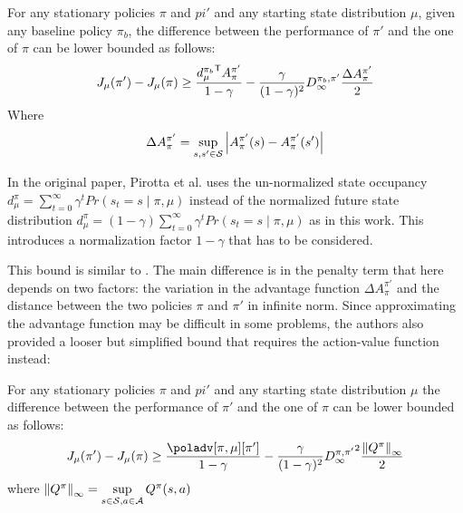 \begin{theorem}\label{th:pirotta-bound1}
For any stationary policies $\pi$ and $pi'$ and any starting state distribution $\mu$, given any baseline policy $\pi_b$, the difference between the performance of $\pi'$ and the one of $\pi$ can be lower bounded as follows:
\begin{equation}
J_{\mu}(\pi') - J_\mu(\pi) \geq \frac{\transpose{d_\mu^{\pi_b}}A_\pi^{\pi'}}{1-\gamma} - \frac{\gamma}{(1-\gamma)^2}{D_\infty^{\pi_b, \pi'}} \frac{\Delta A_{\pi}^{\pi'}}{2}
\end{equation}
Where
\begin{equation}
\Delta A_{\pi}^{\pi'} = \sup_{s, s'\in\sspace}\left|{A_\pi^{\pi'}(s) - A_\pi^{\pi'}(s')}\right|
\end{equation}
\end{theorem}
\begin{note}
In the original paper, Pirotta et al. uses the un-normalized state occupancy $d_{\mu}^{\pi} = \sum_{t=0}^{\infty}\gamma^t Pr(s_t = s \mid \pi, \mu)$ instead of the normalized future state distribution $d_{\mu}^{\pi} = (1-\gamma)\sum_{t=0}^{\infty}\gamma^t Pr(s_t = s \mid \pi, \mu)$ as in this work. This introduces a normalization factor $1-\gamma$ that has to be considered.
\end{note}

This bound is similar to . The main difference is in the penalty term that here depends on two factors: the variation in the advantage function $\Delta A_\pi^{\pi'}$ and the distance between the two policies $\pi$ and $\pi'$ in infinite norm. Since approximating the advantage function may be difficult in some problems, the authors also provided a looser but simplified bound that requires the action-value function instead:

\begin{theorem}
\label{th:pirotta-bound2}
For any stationary policies $\pi$ and $pi'$ and any starting state distribution $\mu$ the difference between the performance of $\pi'$ and the one of $\pi$ can be lower bounded as follows:
\begin{equation}
J_{\mu}(\pi') - J_\mu(\pi) \geq \frac{\poladv[\pi, \mu][\pi']}{1-\gamma} - \frac{\gamma}{(1-\gamma)^2}{D_\infty^{\pi, \pi'}}^2 \frac{\norm[\infty]{Q^\pi}}{2}
\end{equation}
where $\norm[\infty]{Q^{\pi}}=\sup\limits_{\substack{s\in\sspace, a\in\aspace}}Q^{\pi}(s,a)$
\end{theorem}

